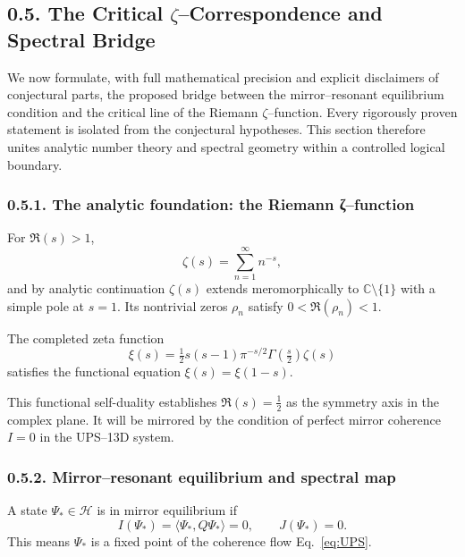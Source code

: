 \subsection*{0.5. The Critical $\zeta$–Correspondence and Spectral Bridge}

\noindent
We now formulate, with full mathematical precision and explicit disclaimers of conjectural parts,
the proposed bridge between the mirror–resonant equilibrium condition
and the critical line of the Riemann $\zeta$–function.
Every rigorously proven statement is isolated from the conjectural hypotheses.
This section therefore unites analytic number theory and spectral geometry within a controlled logical boundary.

\subsubsection*{0.5.1. The analytic foundation: the Riemann ζ–function}

\begin{definition}
For $\Re(s)>1$,
\[
\zeta(s)=\sum_{n=1}^{\infty} n^{-s},
\]
and by analytic continuation $\zeta(s)$ extends meromorphically to $\mathbb{C}\setminus\{1\}$ with a simple pole at $s=1$.
Its nontrivial zeros $\rho_n$ satisfy $0<\Re(\rho_n)<1$.
\end{definition}

\begin{definition}
The completed zeta function
\[
\xi(s)=\tfrac12 s(s-1)\pi^{-s/2}\Gamma\!\left(\tfrac{s}{2}\right)\zeta(s)
\]
satisfies the functional equation $\xi(s)=\xi(1-s)$.
\end{definition}

\begin{remark}
This functional self-duality establishes $\Re(s)=\frac12$ as the symmetry axis in the complex plane.
It will be mirrored by the condition of perfect mirror coherence $I=0$ in the UPS–13D system.
\end{remark}

\subsubsection*{0.5.2. Mirror–resonant equilibrium and spectral map}

\begin{definition}
A state $\Psi_*\in\mathcal{H}$ is in mirror equilibrium if
\[
I(\Psi_*)=\langle\Psi_*,Q\Psi_*\rangle=0,\qquad J(\Psi_*)=0.
\]
\]
This means $\Psi_*$ is a fixed point of the coherence flow Eq.~\eqref{eq:UPS}.
\end{definition}

